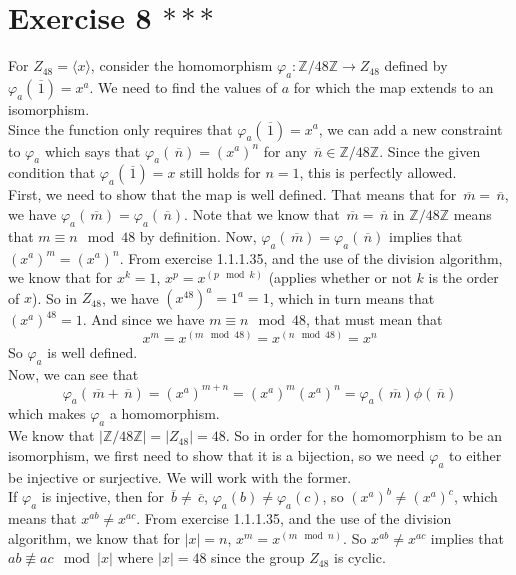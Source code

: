 \documentclass[12pt]{article}
\newcommand{\Z}{\mathbb{Z}}
\newcommand{\olsi}[1]{\,\overline{\!{#1}}}
\begin{document}
    \section*{Exercise 8 $***$}
    For $Z_{48} = \langle x \rangle$,
    consider the homomorphism $\varphi_a: \Z/48\Z \to Z_{48}$
    defined by $\varphi_a(\olsi{1}) = x^a$.
    We need to find the values of $a$ for which the map extends to
    an isomorphism. \\
    Since the function only requires that $\varphi_a(\olsi{1}) = x^a$,
    we can add a new constraint to $\varphi_a$ which says that 
    $\varphi_a(\olsi{n}) = (x^a)^n$ for any $\olsi{n} \in \Z/48\Z$.
    Since the given condition that $\varphi_a(\olsi{1}) = x$
    still holds for $n = 1$, this is perfectly allowed. \\
    First, we need to show that the map is well defined.
    That means that for $\olsi{m} = \olsi{n}$,
    we have $\varphi_a(\olsi{m}) = \varphi_a(\olsi{n})$.
    Note that we know that $\olsi{m} = \olsi{n}$ in $\Z/48\Z$
    means that $m \equiv n \mod 48$ by definition.
    Now, $\varphi_a(\olsi{m}) = \varphi_a(\olsi{n})$
    implies that $(x^a)^m = (x^a)^n$.
    From exercise 1.1.1.35, and the use of the division
    algorithm, we know that for $x^k = 1$, $x^p = x^{(p \mod k)}$
    (applies whether or not $k$ is the order of $x$).
    So in $Z_{48}$, we have $(x^{48})^a = 1^a = 1$,
    which in turn means that $(x^a)^{48} = 1$.
    And since we have $m \equiv n \mod 48$, that must mean
    that
    \[ x^m = x^{(m \mod 48)} = x^{(n \mod 48)} = x^n \]
    So $\varphi_a$ is well defined. \\
    Now, we can see that
    \[ \varphi_a(\olsi{m} + \olsi{n}) = (x^a)^{m + n}
    = (x^a)^m(x^a)^n
    = \varphi_a(\olsi{m})\phi(\olsi{n})  \]
    which makes $\varphi_a$ a homomorphism. \\
    We know that $|\Z/48\Z| = |Z_{48}| = 48$.
    So in order for the homomorphism to be an isomorphism,
    we first need to show that it is a bijection,
    so we need $\varphi_a$ to either be injective or surjective.
    We will work with the former. \\
    If $\varphi_a$ is injective,
    then for $\olsi{b} \neq \olsi{c}$,
    $\varphi_a(b) \neq \varphi_a(c)$,
    so $(x^a)^b \neq (x^a)^c$,
    which means that $x^{ab} \neq x^{ac}$.
    From exercise 1.1.1.35, and the use of the division
    algorithm, we know that for $|x| = n$, $x^m = x^{(m \mod n)}$.
    So $x^{ab} \neq x^{ac}$ implies that $ab \not\equiv ac \mod |x|$
    where $|x| = 48$ since the group $Z_{48}$ is cyclic.
\end{document}
